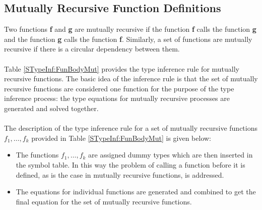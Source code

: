 \documentclass[11pt]{article}
\begin{document}
\subsection {Mutually Recursive Function Definitions}\label{STypeInf:FDefnMRec}
Two functions {\bf f} and {\bf g} are mutually recursive if the function {\bf f} calls the function {\bf g} and the function {\bf g} calls the function {\bf f}. Similarly, a set of functions are mutually recursive if there is a circular dependency between them.
~~\\~~\\ 
Table \ref {STypeInf:FunBodyMut} provides the type inference rule for mutually recursive functions. The basic idea of the inference rule is that the set of mutually recursive functions are considered one function for the purpose of the type inference process: the type equations for mutually recursive processes are generated and solved together.
~~\\~~\\
The description of the type inference rule for a set of mutually recursive functions ${f_1,\ldots,f_k}$ provided in Table \ref {STypeInf:FunBodyMut} is given below:
\begin{itemize}
  \item The functions ${f_1,\ldots,f_k}$ are assigned  dummy types which are then inserted in the symbol table. In this way the problem of calling a function before it is defined, as is the case in mutually recursive functions, is addressed.
  \item The equations for individual functions are generated and combined to get the final equation for the set of mutually recursive functions.
\end{itemize}
\end{document}
